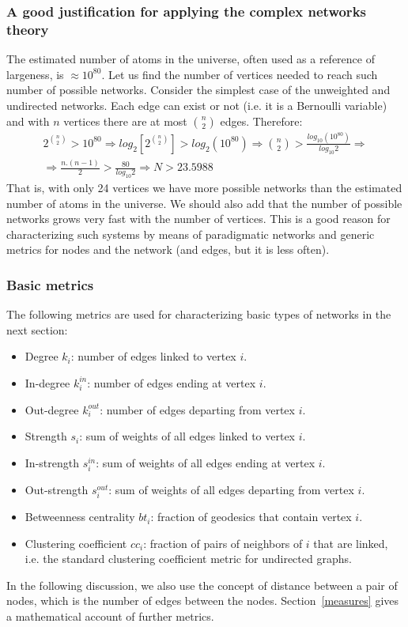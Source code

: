 \subsubsection{A good justification for applying the complex networks theory}
The estimated number of atoms in the universe, often used as a reference of largeness,
is $\approx 10^{80}$.
Let us find the number of vertices needed to reach such number of possible networks.
Consider the simplest case of the unweighted and undirected networks.
Each edge can exist or not (i.e. it is a Bernoulli variable) and with $n$ vertices there are
at most ${n \choose 2}$ edges.
Therefore:
\begin{align}
2^{n \choose 2} > 10^{80} \Rightarrow 
log_2[2^{n \choose 2}] > log_2(10^{80}) \Rightarrow
{n \choose 2} > \frac{log_{10}(10^{80})}{log_{10}2} \Rightarrow \nonumber\\
\Rightarrow \frac{n.(n-1)}{2} > \frac{80}{log_{10}2} \Rightarrow
N > 23.5988 \;\;\;\;\;\;\;\;\;\;\;\;\;\;\;\;\;\;\;\;\;
\end{align}
That is, with only 24 vertices we have more possible networks than
the estimated number of atoms in the universe.
We should also add that the number of possible networks grows
very fast with the number of vertices.
This is a good reason for characterizing such systems by means
of paradigmatic networks and generic metrics for nodes and the network (and edges, but it is less often).

\subsubsection{Basic metrics}\label{se:intMea}
The following metrics are used for characterizing basic types
of networks in the next section:
\begin{itemize}
\item Degree $k_i$: number of edges linked to vertex $i$.
\item In-degree $k_i^{in}$: number of edges ending at vertex $i$.
\item Out-degree $k_i^{out}$: number of edges departing from vertex $i$.
\item Strength $s_i$: sum of weights of all edges linked to vertex $i$.
\item In-strength $s_i^{in}$: sum of weights of all edges ending at vertex $i$.
\item Out-strength $s_i^{out}$: sum of weights of all edges departing from vertex $i$.
\item Betweenness centrality $bt_i$: fraction of geodesics that contain vertex $i$.
\item Clustering coefficient $cc_i$: fraction of pairs of neighbors of $i$ that are linked, i.e. the standard clustering coefficient metric for undirected graphs.
\end{itemize}
In the following discussion, we also use the concept of distance between a pair of nodes,
which is the number of edges between the nodes.
Section~\ref{measures} gives a mathematical account of further metrics.

